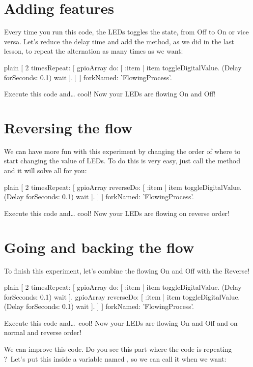 \documentclass[10pt,twoside,english]{_support/latex/sbabook/sbabook}
\begin{document}
\section{Adding features}
Every time you run this code, the LEDs toggles the state, from Off to On or vice versa. Let’s reduce the delay time and add the  method, as we did in the last lesson, to repeat the alternation as many times as we want:

\begin{displaycode}{plain}
[ 2 timesRepeat: [
    gpioArray do: [ :item | item toggleDigitalValue. (Delay forSeconds: 0.1) wait ].
] ] forkNamed: 'FlowingProcess'.
\end{displaycode}

Execute this code and… cool! Now your LEDs are flowing On and Off!
\section{Reversing the flow}
We can have more fun with this experiment by changing the order of where to start changing the value of LEDs. To do this is very easy, just call the method  and it will solve all for you:

\begin{displaycode}{plain}
[ 2 timesRepeat: [
    gpioArray reverseDo: [ :item | item toggleDigitalValue. (Delay forSeconds: 0.1) wait ].
] ] forkNamed: 'FlowingProcess'.
\end{displaycode}

Execute this code and… cool! Now your LEDs are flowing on reverse order!
\section{Going and backing the flow}
To finish this experiment, let’s combine the flowing On and Off with the Reverse!

\begin{displaycode}{plain}
[ 2 timesRepeat: [
    gpioArray do: [ :item | item toggleDigitalValue. (Delay forSeconds: 0.1) wait ].
    gpioArray reverseDo: [ :item | item toggleDigitalValue. (Delay forSeconds: 0.1) wait ].
] ] forkNamed: 'FlowingProcess'.
\end{displaycode}

Execute this code and… cool! Now your LEDs are flowing On and Off and on normal and reverse order!

We can improve this code. Do you see this part where the code is repeating  ? Let's put this inside a variable named , so we can call it when we want:
\end{document}
